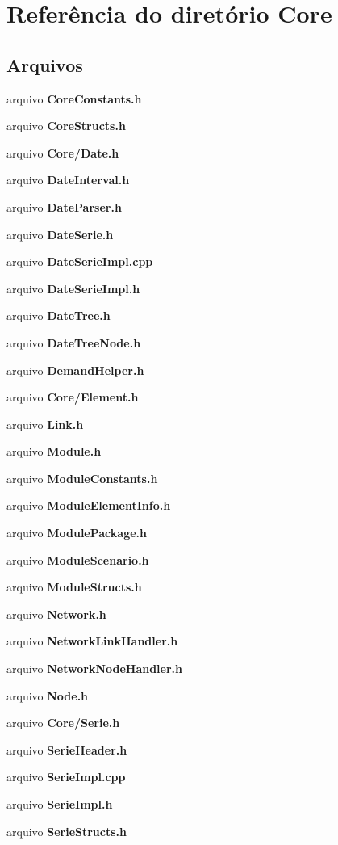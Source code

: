 \section{Referência do diretório Core}
\label{dir_8213943ce0b792be39d34390845932ae}
\subsection*{Arquivos}
\begin{DoxyCompactItemize}
\item 
arquivo {\bf Core\+Constants.\+h}
\item 
arquivo {\bf Core\+Structs.\+h}
\item 
arquivo {\bf Core/\+Date.\+h}
\item 
arquivo {\bf Date\+Interval.\+h}
\item 
arquivo {\bf Date\+Parser.\+h}
\item 
arquivo {\bf Date\+Serie.\+h}
\item 
arquivo {\bf Date\+Serie\+Impl.\+cpp}
\item 
arquivo {\bf Date\+Serie\+Impl.\+h}
\item 
arquivo {\bf Date\+Tree.\+h}
\item 
arquivo {\bf Date\+Tree\+Node.\+h}
\item 
arquivo {\bf Demand\+Helper.\+h}
\item 
arquivo {\bf Core/\+Element.\+h}
\item 
arquivo {\bf Link.\+h}
\item 
arquivo {\bf Module.\+h}
\item 
arquivo {\bf Module\+Constants.\+h}
\item 
arquivo {\bf Module\+Element\+Info.\+h}
\item 
arquivo {\bf Module\+Package.\+h}
\item 
arquivo {\bf Module\+Scenario.\+h}
\item 
arquivo {\bf Module\+Structs.\+h}
\item 
arquivo {\bf Network.\+h}
\item 
arquivo {\bf Network\+Link\+Handler.\+h}
\item 
arquivo {\bf Network\+Node\+Handler.\+h}
\item 
arquivo {\bf Node.\+h}
\item 
arquivo {\bf Core/\+Serie.\+h}
\item 
arquivo {\bf Serie\+Header.\+h}
\item 
arquivo {\bf Serie\+Impl.\+cpp}
\item 
arquivo {\bf Serie\+Impl.\+h}
\item 
arquivo {\bf Serie\+Structs.\+h}
\end{DoxyCompactItemize}
